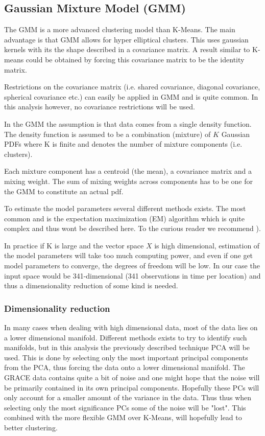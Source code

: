 \subsection{Gaussian Mixture Model (GMM)}
The GMM is a more advanced clustering model than K-Means. 
The main advantage is that GMM allows for hyper elliptical clusters. This uses gaussian kernels with its the shape described in a covariance matrix. A result similar to K-means could be obtained by forcing this covariance matrix to be the identity matrix.

Restrictions on the covariance matrix (i.e. shared covariance, diagonal covariance, spherical covariance etc.) can easily be applied in GMM and is quite common. In this analysis however, no covariance restrictions will be used.

In the GMM the assumption is that data comes from a single density function.
The density function is assumed to be a combination (mixture) of $K$ Gaussian PDFs where K is finite and denotes the number of mixture components (i.e. clusters).

Each mixture component has a centroid (the mean), a covariance matrix and a mixing weight.
The sum of mixing weights across components has to be one for the GMM to constitute an actual pdf.

To estimate the model parameters several different methods exists. The most common and is the expectation maximization (EM) algorithm which is quite complex and thus wont be described here. To the curious reader we recommend \cite[p.~214,272,463]{statistical-learning}).

In practice if K is large and the vector space $X$ is high dimensional, estimation of the model parameters will take too much computing power, and even if one get model parameters to converge, the degrees of freedom will be low.
In our case the input space would be 341-dimensional (341 observations in time per location) and thus a dimensionality reduction of some kind is needed. 

\subsubsection{Dimensionality reduction}
In many cases when dealing with high dimensional data, most of the data lies on a lower dimensional manifold. 
Different methods exists to try to identify such manifolds, but in this analysis the previously described technique PCA will be used. 
This is done by selecting only the most important principal components from the PCA, thus forcing the data onto a lower dimensional manifold.
The GRACE data contains quite a bit of noise and one might hope that the noise will be primarily contained in its own principal components. Hopefully these PCs will only account for a smaller amount of the variance in the data. 
Thus thus when selecting only the most significance PCs some of the noise will be "lost".
This combined with the more flexible GMM over K-Means, will hopefully lead to better clustering.
